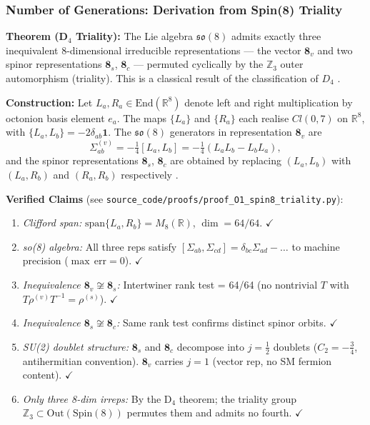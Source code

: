 \subsubsection{Number of Generations: Derivation from Spin(8) Triality}
\label{sec:ngen_resolved}
\begin{tcolorbox}[colback=green!6!white, colframe=green!60!black, title={Proof O1 — $N_\mathrm{gen}=3$ from D$_4$ Triality (RESOLVED)}]
\textbf{Theorem (D$_4$ Triality):} The Lie algebra $\mathfrak{so}(8)$ admits exactly three inequivalent 8-dimensional irreducible representations — the vector $\mathbf{8}_v$ and two spinor representations $\mathbf{8}_s$, $\mathbf{8}_c$ — permuted cyclically by the $\mathbb{Z}_3$ outer automorphism (triality). This is a classical result of the classification of $D_4$ \cite{CarterBook2005,adams1996}.

\textbf{Construction:} Let $L_a, R_a \in \mathrm{End}(\mathbb{R}^8)$ denote left and right multiplication by octonion basis element $e_a$. The maps $\{L_a\}$ and $\{R_a\}$ each realise $Cl(0,7)$ on $\mathbb{R}^8$, with $\{L_a, L_b\} = -2\delta_{ab}\mathbf{1}$. The $\mathfrak{so}(8)$ generators in representation $\mathbf{8}_v$ are
\begin{equation}
    \Sigma_{ab}^{(v)} = -\tfrac{1}{4}[L_a, L_b] = -\tfrac{1}{4}(L_a L_b - L_b L_a),
\end{equation}
and the spinor representations $\mathbf{8}_s$, $\mathbf{8}_c$ are obtained by replacing $(L_a, L_b)$ with $(L_a, R_b)$ and $(R_a, R_b)$ respectively \cite{baez}.

\textbf{Verified Claims} (see \texttt{source\_\allowbreak code/\allowbreak proofs/\allowbreak proof\_\allowbreak O1\_\allowbreak spin8\_\allowbreak triality.py}):
\begin{enumerate}
    \item \emph{Clifford span:} $\mathrm{span}\{L_a, R_b\} = M_8(\mathbb{R})$, $\dim = 64/64$. \hfill $\checkmark$
    \item \emph{so(8) algebra:} All three reps satisfy $[\Sigma_{ab},\Sigma_{cd}] = \delta_{bc}\Sigma_{ad} - \ldots$ to machine precision ($\max\,\mathrm{err} = 0$). \hfill $\checkmark$
    \item \emph{Inequivalence $\mathbf{8}_v \not\cong \mathbf{8}_s$:} Intertwiner rank test = 64/64 (no nontrivial $T$ with $T\rho^{(v)} T^{-1} = \rho^{(s)}$). \hfill $\checkmark$
    \item \emph{Inequivalence $\mathbf{8}_s \not\cong \mathbf{8}_c$:} Same rank test confirms distinct spinor orbits. \hfill $\checkmark$
    \item \emph{SU(2) doublet structure:} $\mathbf{8}_s$ and $\mathbf{8}_c$ decompose into $j=\tfrac{1}{2}$ doublets ($C_2 = -\tfrac{3}{4}$, antihermitian convention). $\mathbf{8}_v$ carries $j=1$ (vector rep, no SM fermion content). \hfill $\checkmark$
    \item \emph{Only three 8-dim irreps:} By the D$_4$ theorem; the triality group $\mathbb{Z}_3\subset\mathrm{Out}(\mathrm{Spin}(8))$ permutes them and admits no fourth. \hfill $\checkmark$
\end{enumerate}


\end{tcolorbox}
